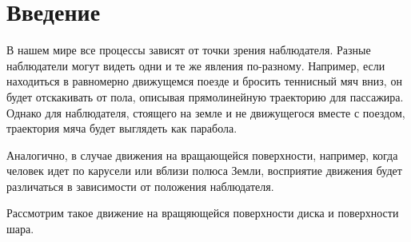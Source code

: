 \section{Введение}
В нашем мире все процессы зависят от точки зрения наблюдателя. Разные наблюдатели могут видеть одни и те же явления по-разному. Например, если находиться в равномерно движущемся поезде и бросить теннисный мяч вниз, он будет отскакивать от пола, описывая прямолинейную траекторию для пассажира. Однако для наблюдателя, стоящего на земле и не движущегося вместе с поездом, траектория мяча будет выглядеть как парабола.

Аналогично, в случае движения на вращающейся поверхности, например, когда человек идет по карусели или вблизи полюса Земли, восприятие движения будет различаться в зависимости от положения наблюдателя.

Рассмотрим такое движение на вращяющейся поверхности диска и поверхности  шара.